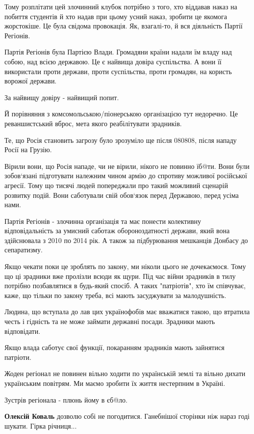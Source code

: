 \begin{itemize}
Тому розплітати цей злочинний клубок потрібно з того, хто віддавав наказ на
побиття студентів й хто надав при цьому усний наказ, зробити це якомога
жорстокіше. Це була свідома провокація. Як, взагалі-то, й вся діяльність Партії
Регіонів.

Партія Регіонів була Партією Влади. Громадяни країни надали їм владу над собою,
над всією державою. Це є найвища довіра суспільства. А вони її використали
проти держави, проти суспільства, проти громадян, на користь ворожої держави.

За найвищу довіру - найвищий попит.

Й порівняння з комсомольською/піонерською організацією тут недоречно. Це
реваншистський вброс, мета якого реабілітувати зрадників.

Те, що Росія становить загрозу було зрозуміло ще після 080808, після нападу
Росії на Грузію.

Вірили вони, що Росія нападе, чи не вірили, нікого не повинно їб@ти. Вони були
зобов`язані підготувати належним чином армію до спротиву можливої російської
агресії. Тому що тисячі людей попереджали про такий можливий сценарій розвитку
подій. Вони саботували свій обов`язок перед Державою, перед усіма нами.

Партія Регіонів - злочинна організація та має понести колективну
відповідальність за умисний саботаж обороноздатності держави, який вона
здійснювала з 2010 по 2014 рік. А також за підбурювання мешканців Донбасу до
сепаратизму.

Якщо чекати поки це зроблять по закону, ми ніколи цього не дочекаємося. Тому що
ці зрадники вже пролізли всюди як щури. Під час війни зрадників в тилу потрібно
позбавлятися в будь-який спосіб. А таких "патріотів", хто їм співчуває, каже,
що тільки по закону треба, всі мають засуджувати за малодушність.

Людина, що вступала до лав цих українофобів має вважатися такою, що втратила
честь і гідність та не може займати державні посади. Зрадники мають
відповідати.

Якщо влада саботує свої функції, покаранням зрадників мають зайнятися патріоти.

Жоден регіонал не повинен вільно ходити по українській землі та вільно дихати
українським повітрям. Ми маємо зробити їх життя нестерпним в Україні.

Зустрів регіонала - плюнь йому в єб@ло.

\begin{itemize} %
\textbf{Олексій Коваль} дозволю собі не погодитися. Ганебнішої сторінки ніж нараз годі шукати. Гірка річниця...


\end{itemize}
\end{itemize}
